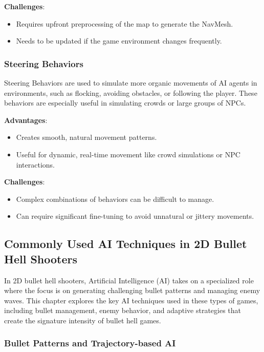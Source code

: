 \documentclass{article} %
\begin{document}
\textbf{Challenges}:
\begin{itemize}
	\item Requires upfront preprocessing of the map to generate the NavMesh.
	\item Needs to be updated if the game environment changes frequently.
\end{itemize}

\subsubsection{Steering Behaviors}

Steering Behaviors are used to simulate more organic movements of AI agents in environments, such as flocking, avoiding obstacles, or following the player. These behaviors are especially useful in simulating crowds or large groups of NPCs.

\textbf{Advantages}:
\begin{itemize}
	\item Creates smooth, natural movement patterns.
	\item Useful for dynamic, real-time movement like crowd simulations or NPC interactions.
\end{itemize}

\textbf{Challenges}:
\begin{itemize}
	\item Complex combinations of behaviors can be difficult to manage.
	\item Can require significant fine-tuning to avoid unnatural or jittery movements.
\end{itemize}

\subsection{Commonly Used AI Techniques in 2D Bullet Hell Shooters}

In 2D bullet hell shooters, Artificial Intelligence (AI) takes on a specialized role where the focus is on generating challenging bullet patterns and managing enemy waves. This chapter explores the key AI techniques used in these types of games, including bullet management, enemy behavior, and adaptive strategies that create the signature intensity of bullet hell games.

\subsubsection{Bullet Patterns and Trajectory-based AI}
\end{document}
